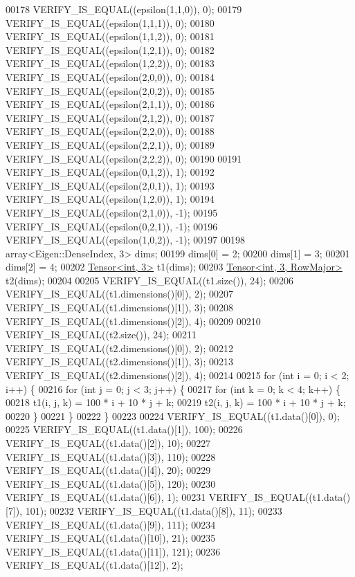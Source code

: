 \begin{DoxyCode}
00178   VERIFY\_IS\_EQUAL((epsilon(1,1,0)), 0);
00179   VERIFY\_IS\_EQUAL((epsilon(1,1,1)), 0);
00180   VERIFY\_IS\_EQUAL((epsilon(1,1,2)), 0);
00181   VERIFY\_IS\_EQUAL((epsilon(1,2,1)), 0);
00182   VERIFY\_IS\_EQUAL((epsilon(1,2,2)), 0);
00183   VERIFY\_IS\_EQUAL((epsilon(2,0,0)), 0);
00184   VERIFY\_IS\_EQUAL((epsilon(2,0,2)), 0);
00185   VERIFY\_IS\_EQUAL((epsilon(2,1,1)), 0);
00186   VERIFY\_IS\_EQUAL((epsilon(2,1,2)), 0);
00187   VERIFY\_IS\_EQUAL((epsilon(2,2,0)), 0);
00188   VERIFY\_IS\_EQUAL((epsilon(2,2,1)), 0);
00189   VERIFY\_IS\_EQUAL((epsilon(2,2,2)), 0);
00190 
00191   VERIFY\_IS\_EQUAL((epsilon(0,1,2)), 1);
00192   VERIFY\_IS\_EQUAL((epsilon(2,0,1)), 1);
00193   VERIFY\_IS\_EQUAL((epsilon(1,2,0)), 1);
00194   VERIFY\_IS\_EQUAL((epsilon(2,1,0)), -1);
00195   VERIFY\_IS\_EQUAL((epsilon(0,2,1)), -1);
00196   VERIFY\_IS\_EQUAL((epsilon(1,0,2)), -1);
00197 
00198   array<Eigen::DenseIndex, 3> dims;
00199   dims[0] = 2;
00200   dims[1] = 3;
00201   dims[2] = 4;
00202   \hyperlink{class_eigen_1_1_tensor}{Tensor<int, 3>} t1(dims);
00203   \hyperlink{class_eigen_1_1_tensor}{Tensor<int, 3, RowMajor>} t2(dims);
00204 
00205   VERIFY\_IS\_EQUAL((t1.size()), 24);
00206   VERIFY\_IS\_EQUAL((t1.dimensions()[0]), 2);
00207   VERIFY\_IS\_EQUAL((t1.dimensions()[1]), 3);
00208   VERIFY\_IS\_EQUAL((t1.dimensions()[2]), 4);
00209 
00210   VERIFY\_IS\_EQUAL((t2.size()), 24);
00211   VERIFY\_IS\_EQUAL((t2.dimensions()[0]), 2);
00212   VERIFY\_IS\_EQUAL((t2.dimensions()[1]), 3);
00213   VERIFY\_IS\_EQUAL((t2.dimensions()[2]), 4);
00214 
00215   \textcolor{keywordflow}{for} (\textcolor{keywordtype}{int} i = 0; i < 2; i++) \{
00216     \textcolor{keywordflow}{for} (\textcolor{keywordtype}{int} j = 0; j < 3; j++) \{
00217       \textcolor{keywordflow}{for} (\textcolor{keywordtype}{int} k = 0; k < 4; k++) \{
00218         t1(i, j, k) = 100 * i + 10 * j + k;
00219         t2(i, j, k) = 100 * i + 10 * j + k;
00220       \}
00221     \}
00222   \}
00223 
00224   VERIFY\_IS\_EQUAL((t1.data()[0]),    0);
00225   VERIFY\_IS\_EQUAL((t1.data()[1]),  100);
00226   VERIFY\_IS\_EQUAL((t1.data()[2]),   10);
00227   VERIFY\_IS\_EQUAL((t1.data()[3]),  110);
00228   VERIFY\_IS\_EQUAL((t1.data()[4]),   20);
00229   VERIFY\_IS\_EQUAL((t1.data()[5]),  120);
00230   VERIFY\_IS\_EQUAL((t1.data()[6]),    1);
00231   VERIFY\_IS\_EQUAL((t1.data()[7]),  101);
00232   VERIFY\_IS\_EQUAL((t1.data()[8]),   11);
00233   VERIFY\_IS\_EQUAL((t1.data()[9]),  111);
00234   VERIFY\_IS\_EQUAL((t1.data()[10]),  21);
00235   VERIFY\_IS\_EQUAL((t1.data()[11]), 121);
00236   VERIFY\_IS\_EQUAL((t1.data()[12]),   2);

\end{DoxyCode}
